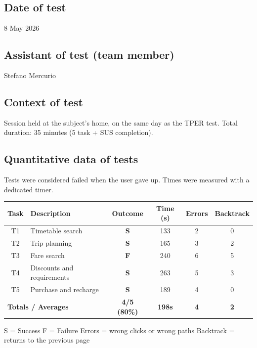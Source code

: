 ﻿\documentclass[11pt,a4paper]{article}
\begin{document}
\subsection*{Date of test}
\begin{tcolorbox}[base]
8 May 2026
\end{tcolorbox}

\subsection*{Assistant of test (team member)}
\begin{tcolorbox}[base]
Stefano Mercurio
\end{tcolorbox}

\subsection*{Context of test}
\begin{tcolorbox}[base]
Session held at the subject's home, on the same day as the
TPER test. Total duration: 35 minutes (5 task +
SUS completion).
\end{tcolorbox}

\subsection*{Quantitative data of tests}
\begin{tcolorbox}[base]
Tests were considered failed when the user gave up.
Times were measured with a dedicated timer.
\begin{center}
\renewcommand{\arraystretch}{1.4}
\begin{tabular}{clcccc}
\toprule
\textbf{Task} & \textbf{Description} &
\textbf{Outcome} & \textbf{Time (s)} &
\textbf{Errors} & \textbf{Backtrack} \\
\midrule
T1 & Timetable search             & \textbf{S} & 133 & 2 & 0 \\
T2 & Trip planning & \textbf{S} & 165 & 3 & 2 \\
T3 & Fare search           & \textbf{F} & 240 & 6 & 5 \\
T4 & Discounts and requirements  & \textbf{S} & 263 & 5 & 3 \\
T5 & Purchase and recharge       & \textbf{S} & 189 & 4 & 0 \\
\midrule
\multicolumn{2}{l}{\textbf{Totals / Averages}} &
\textbf{4/5 (80\%)} & \textbf{198s} &
\textbf{4} & \textbf{2} \\
\bottomrule
\end{tabular}
\end{center}
\vspace{0.3cm}
\small S = Success \quad F = Failure \quad
Errors = wrong clicks or wrong paths \quad
Backtrack = returns to the previous page
\end{tcolorbox}
\end{document}
